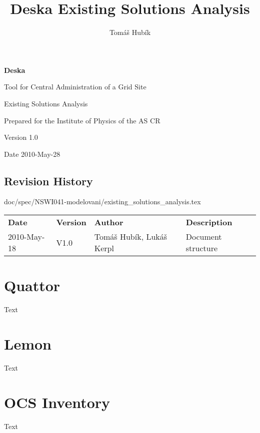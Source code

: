 \documentclass[12pt]{article}
\author{Tomáš Hubík}
\title{Deska Existing Solutions Analysis}
\begin{document}
{\Huge \textbf{Deska}}

\vspace{0.2in}

{\large Tool for Central Administration of a Grid Site}

\vspace{0.5in}

{\large Existing Solutions Analysis}

\vspace{0.2in}

{\large Prepared for the Institute of Physics of the AS CR}

\vspace{0.2in}

{\large Version 1.0}

\vspace{0.2in}

{\large Date 2010-May-28}

\vspace{0.5in}

\subsection*{Revision History}

\begin{table}[!h]doc/spec/NSWI041-modelovani/existing\_solutions\_analysis.tex
	\begin{tabular}{l l l l}
		\textbf{Date} & \textbf{Version} & \textbf{Author} & \textbf{Description} \\
		2010-May-18 & V1.0 & Tomáš Hubík, Lukáš Kerpl & Document structure \\ 
	\end{tabular}
	\label{tab:RevisionHistory}
\end{table}

\newpage

\tableofcontents

\newpage


\section{Quattor}
Text

\section{Lemon}
Text

\section{OCS Inventory}
Text
\end{document}
